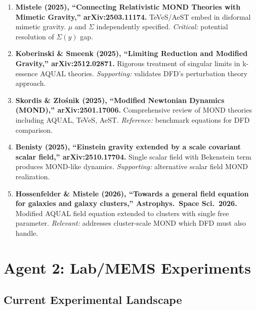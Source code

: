 \documentclass[11pt]{article}
\begin{document}
\begin{tcolorbox}[colback=green!5!white, colframe=green!50!black,
  title=\textbf{Agent 1: NEW LITERATURE REVIEWED}]

\begin{enumerate}

\item \textbf{Mistele (2025), ``Connecting Relativistic MOND Theories
  with Mimetic Gravity,'' arXiv:2503.11174.}
  TeVeS/AeST embed in disformal mimetic gravity. $\mu$ and $\Sigma$
  independently specified. \emph{Critical:} potential resolution of
  $\Sigma(y)$ gap.

\item \textbf{Koberinski \& Smeenk (2025), ``Limiting Reduction and
  Modified Gravity,'' arXiv:2512.02871.}
  Rigorous treatment of singular limits in k-essence AQUAL theories.
  \emph{Supporting:} validates DFD's perturbation theory approach.

\item \textbf{Skordis \& Z\l{}o\'snik (2025), ``Modified Newtonian
  Dynamics (MOND),'' arXiv:2501.17006.}
  Comprehensive review of MOND theories including AQUAL, TeVeS, AeST.
  \emph{Reference:} benchmark equations for DFD comparison.

\item \textbf{Benisty (2025), ``Einstein gravity extended by a scale
  covariant scalar field,'' arXiv:2510.17704.}
  Single scalar field with Bekenstein term produces MOND-like dynamics.
  \emph{Supporting:} alternative scalar field MOND realization.

\item \textbf{Hossenfelder \& Mistele (2026), ``Towards a general field
  equation for galaxies and galaxy clusters,''
  Astrophys.\ Space Sci.\ 2026.}
  Modified AQUAL field equation extended to clusters with single free
  parameter. \emph{Relevant:} addresses cluster-scale MOND which DFD
  must also handle.

\end{enumerate}
\end{tcolorbox}

\section{Agent 2: Lab/MEMS Experiments}

\subsection{Current Experimental Landscape}
\end{document}
